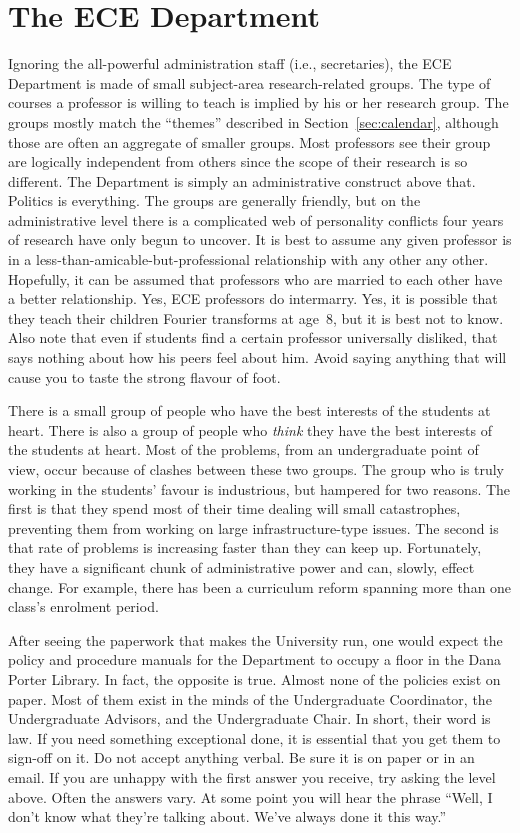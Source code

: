 \documentclass{book}
\begin{document}
\section{The ECE Department}
Ignoring the all-powerful administration staff (i.e., secretaries), the ECE Department is made of small subject-area research-related groups. The type of courses a professor is willing to teach is implied by his or her research group. The groups mostly match the ``themes'' described in Section~\ref{sec:calendar}, although those are often an aggregate of smaller groups. Most professors see their group are logically independent from others since the scope of their research is so different. The Department is simply an administrative construct above that. Politics is everything. The groups are generally friendly, but on the administrative level there is a complicated web of personality conflicts four years of research have only begun to uncover. It is best to assume any given professor is in a less-than-amicable-but-professional relationship with any other any other. Hopefully, it can be assumed that professors who are married to each other have a better relationship. Yes, ECE professors do intermarry. Yes, it is possible that they teach their children Fourier transforms at age~8, but it is best not to know. Also note that even if students find a certain professor universally disliked, that says nothing about how his peers feel about him. Avoid saying anything that will cause you to taste the strong flavour of foot.

There is a small group of people who have the best interests of the students at heart. There is also a group of people who \emph{think} they have the best interests of the students at heart. Most of the problems, from an undergraduate point of view, occur because of clashes between these two groups. The group who is truly working in the students' favour is industrious, but hampered for two reasons. The first is that they spend most of their time dealing will small catastrophes, preventing them from working on large infrastructure-type issues. The second is that rate of problems is increasing faster than they can keep up. Fortunately, they have a significant chunk of administrative power and can, slowly, effect change. For example, there has been a curriculum reform spanning more than one class's enrolment period.

After seeing the paperwork that makes the University run, one would expect the policy and procedure manuals for the Department to occupy a floor in the Dana Porter Library. In fact, the opposite is true. Almost none of the policies exist on paper. Most of them exist in the minds of the Undergraduate Coordinator, the Undergraduate Advisors, and the Undergraduate Chair. In short, their word is law. If you need something exceptional done, it is essential that you get them to sign-off on it. Do not accept anything verbal. Be sure it is on paper or in an email. If you are unhappy with the first answer you receive, try asking the level above. Often the answers vary. At some point you will hear the phrase ``Well, I don't know what they're talking about. We've always done it this way.''
\end{document}
